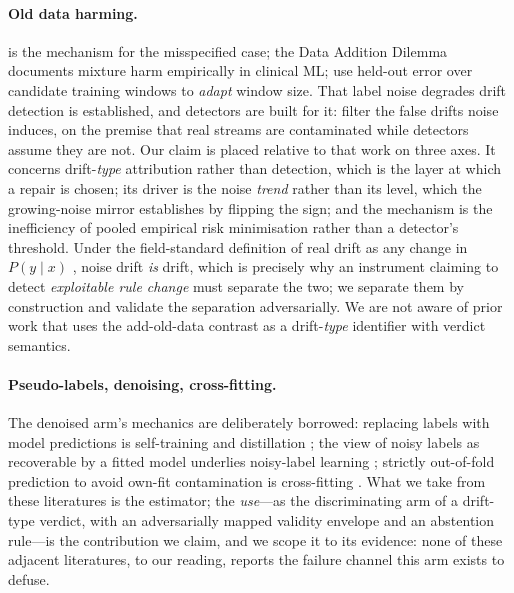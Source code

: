 \documentclass[10pt]{article} %
\begin{document}
\paragraph{Old data harming.} \citet{shimodaira2000improving} is the mechanism for the misspecified case;
the Data Addition Dilemma \citep{shen2024data} documents mixture harm empirically in clinical ML;
\citet{klinkenberg2000detecting} use held-out error over candidate training windows to \emph{adapt}
window size. That label noise degrades drift
detection is established, and detectors are built for it: \citet{wang2022noise} filter the false
drifts noise induces, on the premise that real streams are contaminated while detectors assume they
are not. Our claim is placed relative to that work on three axes. It concerns drift-\emph{type}
attribution rather than detection, which is the layer at which a repair is chosen; its driver is the
noise \emph{trend} rather than its level, which the growing-noise mirror establishes by flipping the
sign; and the mechanism is the inefficiency of pooled empirical risk minimisation rather than a
detector's threshold. Under the field-standard definition of real drift as any change in
$P(y \mid x)$ \citep{gama2014survey,webb2016characterizing}, noise drift \emph{is} drift, which is precisely why an
instrument claiming to detect \emph{exploitable rule change} must separate the two; we separate them
by construction and validate the separation adversarially. We are not aware of prior work that uses
the add-old-data contrast as a drift-\emph{type} identifier with verdict semantics.

\paragraph{Pseudo-labels, denoising, cross-fitting.} The denoised arm's mechanics are deliberately
borrowed: replacing labels with model predictions is self-training \citep{scudder1965probability,lee2013pseudolabel}
and distillation \citep{hinton2015distilling}; the view of noisy labels as recoverable by a fitted
model underlies noisy-label learning \citep{natarajan2013noisy,han2018coteaching}; strictly
out-of-fold prediction to avoid own-fit contamination is cross-fitting \citep{chernozhukov2018double}.
What we take from these literatures is the estimator; the \emph{use}---as the discriminating
arm of a drift-type verdict, with an adversarially mapped validity envelope and an abstention
rule---is the contribution we claim, and we scope it to its evidence: none of these adjacent
literatures, to our reading, reports the failure channel this arm exists to defuse.
\end{document}
